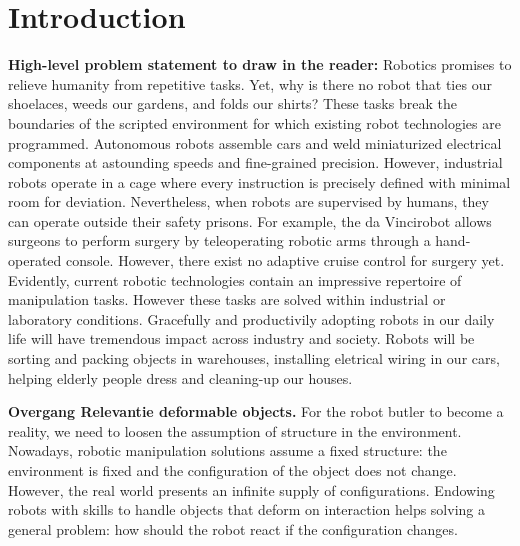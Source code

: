 \documentclass[\home/main.tex]{subfiles}
\begin{document}
\chapter{Introduction}\label{ch:introduction}

\textbf{High-level problem statement to draw in the reader:}
Robotics promises to relieve humanity from repetitive tasks. Yet, why is there no robot that ties our shoelaces, weeds our gardens, and folds our shirts? 
These tasks break the boundaries of the scripted environment for which existing robot technologies are programmed. Autonomous robots assemble cars and weld miniaturized electrical components at astounding speeds and fine-grained precision. However, industrial robots operate in a cage where every instruction is precisely defined with minimal room for deviation. Nevertheless, when robots are supervised by humans, they can operate outside their safety prisons. For example, the da Vinci\textregistered robot allows surgeons to perform surgery by teleoperating robotic arms through a hand-operated console. However, there exist no adaptive cruise control for surgery yet. 
Evidently, current robotic technologies contain an impressive repertoire of manipulation tasks. However these tasks are solved within industrial or laboratory conditions.  
Gracefully and productivily adopting robots in our daily life will have tremendous impact across industry and society. Robots will be sorting and packing objects in warehouses, installing eletrical wiring in our cars, helping elderly people dress and cleaning-up our houses.


\textbf{Overgang Relevantie deformable objects.}
For the robot butler to become a reality, we need to loosen the assumption of structure in the environment. Nowadays, robotic manipulation solutions assume a fixed structure: the environment is fixed and the configuration of the object does not change. However, the real world presents an infinite supply of configurations.  
Endowing robots with skills to handle objects that deform on interaction helps solving a general problem: how should the robot react if the configuration changes.
\end{document}
